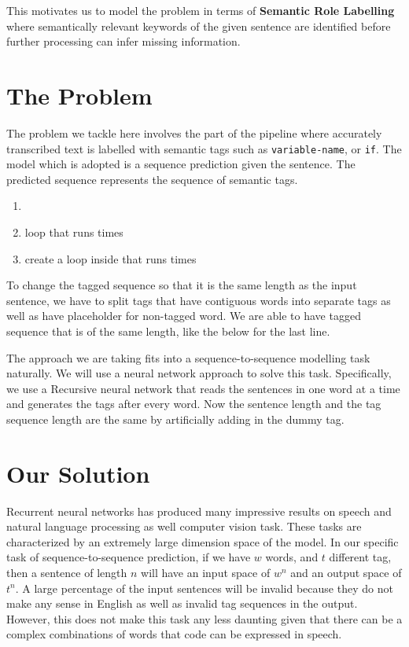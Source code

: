 \documentclass[fyp]{socreport}
\begin{document}
This motivates us to model the problem in terms of \textbf{Semantic Role
Labelling} where semantically relevant keywords of the given sentence are
identified before further processing can infer missing information.

\section{The Problem}

The problem we tackle here involves the part of the pipeline where accurately
transcribed text is labelled with semantic tags such as \texttt{variable-name},
or \texttt{if}. The model which is adopted is a sequence prediction given
the sentence. The predicted sequence represents the sequence of semantic tags.

\begin{enumerate}
\itemsep0em
  \item {}     
      
  \item {} loop that runs  times
  \item create a  loop inside that runs  times
\end{enumerate}

To change the tagged sequence so that it is the same length as the input
sentence, we have to split tags that have contiguous words into separate tags
as well as have placeholder for non-tagged word. We are able to have tagged
sequence that is of the same length, like the below for the last line.

\hspace{20pt}
     

The approach we are taking fits into a sequence-to-sequence modelling task
naturally. We will use a neural network approach to solve this task.
Specifically, we use a Recursive neural network that reads the sentences in one
word at a time and generates the tags after every word. Now the sentence
length and the tag sequence length are the same by artificially adding in the
dummy tag.


\section{Our Solution}
Recurrent neural networks has produced many impressive results on speech and
natural language processing as well computer vision task. These tasks are
characterized by an extremely large dimension space of the model. In our
specific task of sequence-to-sequence prediction, if we have $w$ words, and
$t$ different tag, then a sentence of length $n$ will have an input space
of $w^n$ and an output space of $t^n$. A large percentage of the input sentences
will be invalid because they do not make any sense in English as well as
invalid tag sequences in the output. However, this does not make this
task any less daunting given that there can be a complex combinations of words
that code can be expressed in speech.
\end{document}
